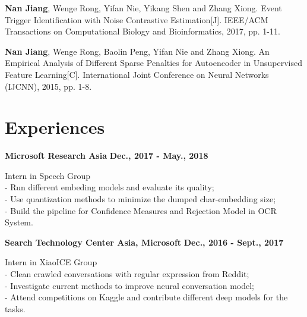 \documentclass[margin,line]{resume}
\begin{document}
\begin{resume}
\textbf{Nan Jiang}, Wenge Rong, Yifan Nie, Yikang Shen and Zhang Xiong. Event Trigger Identification with Noise Contrastive Estimation[J]. IEEE/ACM Transactions on Computational Biology and Bioinformatics, 2017, pp. 1-11.


\textbf{Nan Jiang}, Wenge Rong, Baolin Peng, Yifan Nie and Zhang Xiong. An Empirical Analysis of Different Sparse Penalties
for Autoencoder in Unsupervised Feature Learning[C]. International Joint Conference on Neural Networks (IJCNN), 2015, pp. 1-8.




\section{Experiences}
{\bf Microsoft Research Asia} \hfill {\bf Dec., 2017 - May., 2018}

{Intern in Speech Group} \\
- Run different embeding models and evaluate its quality; \\
- Use quantization methods to minimize the dumped char-embedding size; \\
- Build the pipeline for Confidence Measures and Rejection Model in OCR System.



{\bf Search Technology Center Asia, Microsoft} \hfill {\bf Dec., 2016 - Sept., 2017}

{Intern in XiaoICE Group} \\
- Clean crawled conversations with regular expression from Reddit;\\
- Investigate current methods to improve neural conversation model;\\
- Attend competitions on Kaggle and contribute different deep models for the tasks.




%


%





\end{resume}
\end{document}

